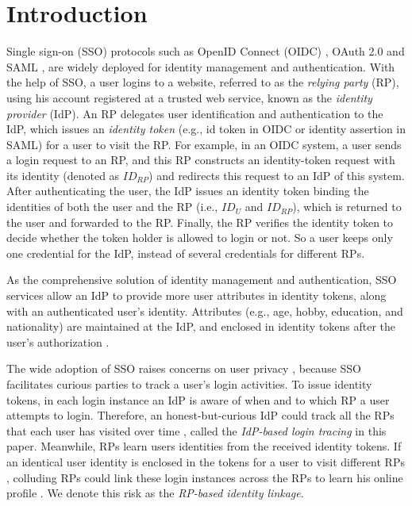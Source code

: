 \section{Introduction}
\label{sec:intro}
Single sign-on (SSO) protocols such as OpenID Connect (OIDC) \cite{OpenIDConnect}, OAuth 2.0 \cite{rfc6749} and SAML \cite{SAML,SAMLIdentifier},
 are widely deployed for identity management and authentication.
 With the help of SSO,
  a user logins to a website, referred to as the \emph{relying party} (RP), using his account registered at a trusted web service,
   known as the \emph{identity provider} (IdP).
An RP delegates user identification and authentication to the IdP,
    which issues an \emph{identity token} (e.g., id token in OIDC or identity assertion in SAML) for a user to visit the RP. %
For example, in an OIDC system,
     a user sends a login request to an RP,
and this RP constructs an identity-token request with its identity (denoted as $ID_{RP}$) and redirects this request to an IdP of this system.
After authenticating the user,
 the IdP issues an identity token binding the identities of both the user and the RP (i.e., $ID_U$ and $ID_{RP}$),
    which is returned to the user and forwarded to the RP.
Finally, the RP verifies the identity token to decide whether the token holder is allowed to login or not.
So a user keeps only one credential for the IdP, instead of several credentials for different RPs.

As the comprehensive solution of identity management and authentication,
    SSO services allow an IdP to provide more user attributes in identity tokens,
        along with an authenticated user's identity.
Attributes (e.g., age, hobby, education, and nationality) are maintained at the IdP,
    and enclosed in identity tokens after the user's authorization \cite{OpenIDConnect,rfc6749}.

The wide adoption of SSO raises concerns on user privacy \cite{NIST2017draft,SPRESSO,BrowserID,maler2008venn},
 because SSO facilitates curious parties to track a user's login activities.
To issue identity tokens,
in each login instance
 an IdP is aware of when and to which RP a user attempts to login.
Therefore, an honest-but-curious IdP could track all the RPs that each user has visited over time \cite{BrowserID,SPRESSO},
 called the {\em IdP-based login tracing} in this paper.
Meanwhile, RPs learn users identities from the received identity tokens.
If an identical user identity is enclosed in the tokens for a user to visit different RPs \cite{maler2008venn,Google,FirefoxAccount},
     colluding RPs could link these login instances across the RPs %
      to learn his online profile \cite{maler2008venn}.
We denote this risk as the {\em RP-based identity linkage}.



